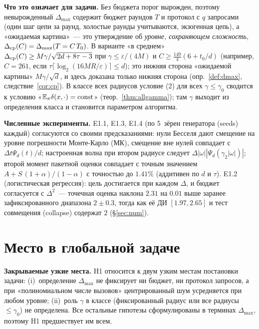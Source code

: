 \documentclass[11pt,a4paper]{article}
\numberwithin{equation}{section}
\theoremstyle{definition}
\theoremstyle{remark}
\newcommand{\E}{\mathbb E}\newcommand{\R}{\mathbb R}\newcommand{\N}{\mathbb N}\let\Prob\relax\newcommand{\Prob}{\mathbb P}
\newcommand{\Dmax}{\Delta_{\max}}\newcommand{\Dcp}{\Delta_{\rm cp}}
\begin{document}
\begin{tcolorbox}[card,title={H1 на одной странице}]
\textbf{Что это означает для задачи.} Без бюджета порог вырожден, поэтому невырожденный $\Dmax$ содержит бюджет раундов $T$ и протокол с $q$ запросами (один шаг цепи за раунд, холостые раунды учитываются, экзогенная цепь), а «ожидаемая картина»~--- это утверждение об \emph{уровне, сохраняющем сложность}, $\Dcp(C)=\Dmax(T=C\,T_0)$. В варианте «в среднем» $\Dcp(C)\ge M\gamma/\sqrt{2d+8\tau-3}$ при $\gamma\le\varepsilon/(4M)$ и $C\ge\frac{149}4(6+t_0/d)$ (например, $C=261$, если $\tau\lceil\log_2(16MR/\varepsilon)\rceil\le d$); это нижняя сторона «ожидаемой картины» $M\gamma/\sqrt d$, и здесь доказана только нижняя сторона (опр.~\ref{def:dmax}, следствие~\ref{cor:cp}). В классе всех радиусов условие (2) для всех $\gamma\le\gamma_0$ сводится к условию «$\E_\pi\delta(x,\cdot)={\rm const}$» (теор.~\ref{thm:allgamma}); там $\gamma$ выходит из определения класса и становится параметром алгоритма.

\textbf{Численные эксперименты.} E1.1, E1.3, E1.4 (по 5~зёрен генератора (seeds) каждый) согласуются со своими предсказаниями: нули Бесселя дают смещение на уровне погрешности Монте-Карло (МК), смещение вне нулей совпадает с $\Delta t\Psi_d(t)/d$; настроенная волна при втором радиусе следует $\Delta|\omega||\Psi_d(\gamma_2|\omega|)|$; второй момент пакетной оценки совпадает с точным значением $A+S\,(1+\alpha)/(1-\alpha)$ с точностью до $1.41\%$ (аддитивен по $d$ и $\tau$). E1.2 (логистическая регрессия): цель достигается при каждом $\Delta$, и бюджет согласуется с $\Delta^2$~--- точечная оценка наклона $2.31$ на $0.01$ выше заранее зафиксированного диапазона $2\pm0.3$, тогда как её ДИ $[1.97,2.65]$ и тест совмещения (collapse) содержат $2$ (\S\ref{sec:num}).

\end{tcolorbox}

\section{Место в глобальной задаче}\label{sec:place}
\textbf{Закрываемые узкие места.} H1 относится к двум узким местам постановки задачи:
(i)~определение $\Dmax$ не фиксирует ни бюджет, ни протокол запросов, а при «полиномиальном числе вызовов» центрированный шум усредняется при любом уровне;
(ii)~роль $\gamma$ в классе (фиксированный радиус или все радиусы $\le\gamma_0$) не определена.
Все остальные гипотезы сформулированы в терминах $\Dmax$, поэтому H1 предшествует им всем.
\end{document}
